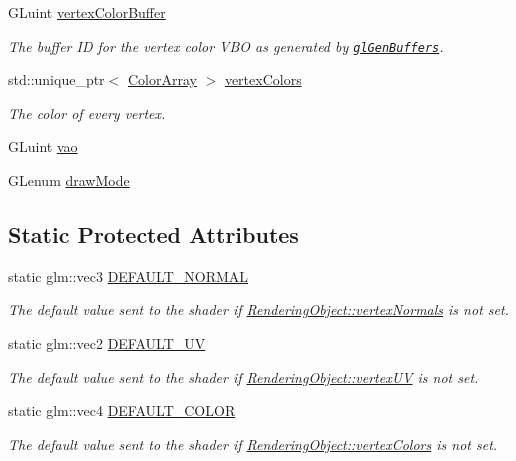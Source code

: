 \begin{DoxyCompactItemize}
G\+Luint \hyperlink{class_rendering_object_aeb014a4ef24e2fc4665a769241660cad}{vertex\+Color\+Buffer}
\begin{DoxyCompactList}\small\item\em The buffer ID for the vertex color V\+BO as generated by \href{https://www.opengl.org/sdk/docs/man/html/glGenBuffers.xhtml}{\tt gl\+Gen\+Buffers}. \end{DoxyCompactList}\item
std\+::unique\+\_\+ptr$<$ \hyperlink{class_rendering_object_a8a12e1f9be788d99af6c089e1c600022}{Color\+Array} $>$ \hyperlink{class_rendering_object_a65fc52e665791ce55e43106b603e917a}{vertex\+Colors}
\begin{DoxyCompactList}\small\item\em The color of every vertex. \end{DoxyCompactList}\item
G\+Luint \hyperlink{class_rendering_object_a96dd05670a977a949514a2c490c1c867}{vao}
\item
G\+Lenum \hyperlink{class_rendering_object_aa67856a72705b54a5667e91e270d00b3}{draw\+Mode}
\end{DoxyCompactItemize}
\subsection*{Static Protected Attributes}
\begin{DoxyCompactItemize}
\item
static glm\+::vec3 \hyperlink{class_rendering_object_af270a476ba12c23fefbb034e21930add}{D\+E\+F\+A\+U\+L\+T\+\_\+\+N\+O\+R\+M\+AL}
\begin{DoxyCompactList}\small\item\em The default value sent to the shader if \hyperlink{class_rendering_object_ac28d301f97d29ab603f65f8e823063b4}{Rendering\+Object\+::vertex\+Normals} is not set. \end{DoxyCompactList}\item
static glm\+::vec2 \hyperlink{class_rendering_object_a3dcb28a12f578630aea75cc59ea39588}{D\+E\+F\+A\+U\+L\+T\+\_\+\+UV}
\begin{DoxyCompactList}\small\item\em The default value sent to the shader if \hyperlink{class_rendering_object_afc405316bddec4ba1d5c228ecc0d9061}{Rendering\+Object\+::vertex\+UV} is not set. \end{DoxyCompactList}\item
static glm\+::vec4 \hyperlink{class_rendering_object_a3bf21996dc0ef604b2b81d95275c97f9}{D\+E\+F\+A\+U\+L\+T\+\_\+\+C\+O\+L\+OR}
\begin{DoxyCompactList}\small\item\em The default value sent to the shader if \hyperlink{class_rendering_object_a65fc52e665791ce55e43106b603e917a}{Rendering\+Object\+::vertex\+Colors} is not set. \end{DoxyCompactList}\end{DoxyCompactItemize}
